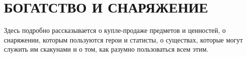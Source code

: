 \chapter{БОГАТСТВО И СНАРЯЖЕНИЕ}
Здесь подробно рассказывается о купле-продаже предметов и ценностей, о снаряжении, которым пользуются герои и статисты, о существах, которые могут служить им скакунами и о том, как разумно пользоваться всем этим.










